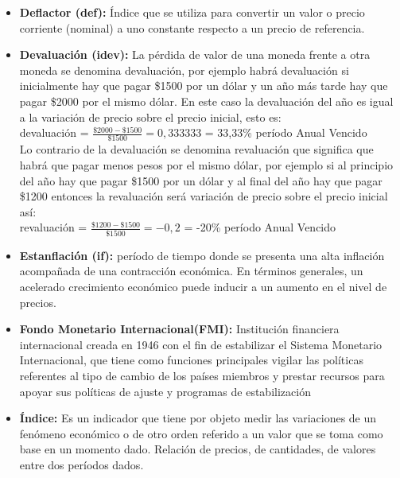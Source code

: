 \begin{itemize}
\item {\textbf{Deflactor (def): }}
Índice que se utiliza para convertir un valor o precio corriente (nominal) a uno constante respecto a un precio de referencia.\\

\item {\textbf{Devaluación (idev): }}	
La pérdida de valor de una moneda frente a otra moneda se denomina devaluación, por ejemplo habrá devaluación si inicialmente hay que pagar \$1500 por un dólar y un año más tarde hay que pagar \$2000 por el mismo dólar. En este caso la devaluación del año es igual a la variación de precio sobre el precio inicial, esto es:\\

devaluación = $\frac{\$2000-\$1500}{\$1500} = 0,333333 $ = 33,33\% período Anual Vencido \\

Lo contrario de la devaluación se denomina revaluación que significa que habrá que pagar menos pesos por el mismo dólar, por ejemplo si al principio del año hay que pagar \$1500 por un dólar y al final del año hay que pagar \$1200 entonces la revaluación será variación de precio sobre el precio inicial así: \\

revaluación = $\frac{\$1200-\$1500}{\$1500} = -0,2$ = -20\% período Anual Vencido \\


\item {\textbf{Estanflación (if): }}
período de tiempo donde se presenta una alta inflación acompañada de una contracción económica. En términos generales, un acelerado crecimiento económico puede inducir a un aumento en el nivel de precios.\\

\item \textbf{Fondo Monetario Internacional(FMI): }
Institución financiera internacional creada en 1946 con el fin de estabilizar el Sistema Monetario Internacional, que tiene como funciones principales vigilar las políticas referentes al tipo de cambio de los países miembros y prestar recursos para apoyar sus políticas de ajuste y programas de estabilización\\

\item {\textbf{Índice: }}
Es un indicador que tiene por objeto medir las variaciones de un fenómeno económico o de otro orden referido a un valor que se toma como base en un momento dado. Relación de precios, de cantidades, de valores entre dos períodos dados.\\


\end{itemize}
